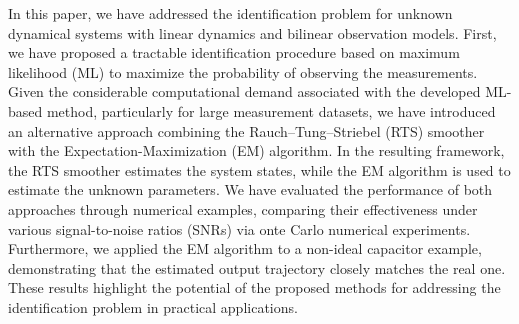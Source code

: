 %
In this paper, we have addressed the identification problem for unknown dynamical systems with linear dynamics and bilinear observation models. 
First, we have proposed a tractable identification procedure based on maximum likelihood (ML) to maximize the probability of observing the measurements. 
Given the considerable computational demand associated with the developed ML-based method, particularly for large measurement datasets, we have introduced an alternative approach combining the Rauch–Tung–Striebel (RTS) smoother with the Expectation-Maximization (EM) algorithm.
In the resulting framework, the RTS smoother estimates the system states, while the EM algorithm is used to estimate the unknown parameters. We have evaluated the performance of both approaches through numerical examples, comparing their effectiveness under various signal-to-noise ratios (SNRs) via onte Carlo numerical experiments. Furthermore, we applied the EM algorithm to a non-ideal capacitor example, demonstrating that the estimated output trajectory closely matches the real one. These results highlight the potential of the proposed methods for addressing the identification problem in practical applications.


